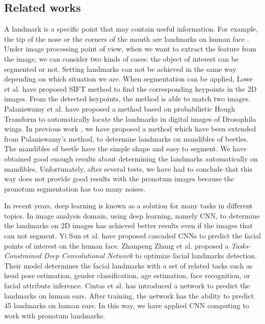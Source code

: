 \documentclass{article} %
\begin{document}
\begin{multicols}{2}
\section{Related works}
A landmark is a specific point that may contain useful information. For example, the tip of the nose or the corners of the mouth are landmarks on human face \cite{sun2013deep}. Under image processing point of view, when we want to extract the feature from the image, we can consider two kinds of cases: the object of interest can be segmented or not. Setting landmarks can not be achieved in the same way depending on which situation we are. When segmentation can be applied, Lowe et al. \cite{lowe2004distinctive} have proposed SIFT method to find the corresponding keypoints in the 2D images. From the detected keypoints, the method is able to match two images. Palaniswamy et al. \cite{palaniswamy2010automatic} have proposed a method based on probabilistic Hough Transform to automatically locate the landmarks in digital images of Drosophila wings. In previous work \cite{le2017maelab}, we have proposed a method which have been extended from Palaniswamy's method, to determine landmarks on mandibles of beetles. The mandibles of beetle have the simple shape and easy to segment. We have obtained good enough results about determining the landmarks automatically on mandibles. Unfortunately, after several tests, we have had to conclude that this way does not provide good results with the pronotum images because the pronotum segmentation has too many noises.

In recent years, deep learning is known as a solution for many tasks in different topics. In image analysis domain, using deep learning, namely CNN, to determine the landmarks on 2D images has achieved better results even if the images that can not segment. Yi Sun et al. \cite{sun2013deep} have proposed cascaded CNNs to predict the facial points of interest on the human face.
Zhanpeng Zhang et al. \cite{zhang2014facial} proposed a \textit{Tasks-Constrained Deep Convolutional Network} to optimize facial landmarks detection. Their model determines the facial landmarks with a set of related tasks such as head pose estimation, gender classification, age estimation, face recognition, or facial attribute inference. Cintas et al. \cite{cintas2016automatic} has introduced a network to predict the landmarks on human ears. After training, the network has the ability to predict 45 landmarks on human ears. In this way, we have applied CNN computing to work with pronotum landmarks.


\end{multicols}
\end{document}
